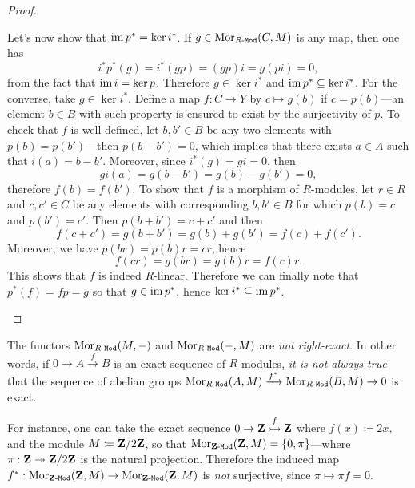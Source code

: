 \begin{proof}
\begin{enumerate}[(a)]
              Let's now show that \(\operatorname{im} p^{*} = \ker i^{*}\). If
              \(g \in \operatorname{Mor}_{{R\text{-}\texttt{Mod}}}(C, M)\) is any map, then one has
              \[
                  i^{*} p^{*}(g) = i^{*}(g p) = (g p) i = g (p i) = 0,
              \]
              from the fact that \(\operatorname{im} i = \ker p\). Therefore \(g \in \ker i^{*}\) and
              \(\operatorname{im} p^{*} \subseteq \ker i^{*}\). For the converse, take
              \(g \in \ker i^{*}\). Define a map \(f: C \to Y\) by \(c \mapsto g(b)\) if
              \(c = p(b)\)---an element \(b \in B\) with such property is ensured to exist
              by the surjectivity of \(p\). To check that \(f\) is well defined, let
              \(b, b' \in B\) be any two elements with \(p(b) = p(b')\)---then
              \(p(b - b') = 0\), which implies that there exists \(a \in A\) such that
              \(i(a) = b - b'\). Moreover, since \(i^{*}(g) = g i = 0\), then
              \[
                  g i(a) = g(b - b') = g(b) - g(b') = 0,
              \]
              therefore \(f(b) = f(b')\). To show that \(f\) is a morphism of \(R\)-modules,
              let \(r \in R\) and \(c, c' \in C\) be any elements with corresponding
              \(b, b' \in B\) for which \(p(b) = c\) and \(p(b') = c'\). Then
              \(p(b + b') = c + c'\) and then
              \[
                  f(c + c') = g(b + b') = g(b) + g(b') = f(c) + f(c').
              \]
              Moreover, we have \(p(b r) = p(b) r = c r\), hence
              \[
                  f(c r) = g(b r) = g(b) r = f(c) r.
              \]
              This shows that \(f\) is indeed \(R\)-linear. Therefore we can finally note
              that \(p^{*}(f) = f p = g\) so that \(g \in \operatorname{im} p^{*}\), hence
              \(\ker i^{*} \subseteq \operatorname{im} p^{*}\).
    \end{enumerate}
\end{proof}

\begin{remark}
    \label{rem:not-right-exact}
    The functors \(\operatorname{Mor}_{{R\text{-}\texttt{Mod}}}(M, -)\) and \(\operatorname{Mor}_{{R\text{-}\texttt{Mod}}}(-, M)\) are \emph{not
        right-exact}. In other words, if \(0 \to A \xrightarrow f B\) is an exact
    sequence of \(R\)-modules, \emph{it is not always true} that the sequence of
    abelian groups
    \(\operatorname{Mor}_{{R\text{-}\texttt{Mod}}}(A, M) \xrightarrow {f^{*}} \operatorname{Mor}_{{R\text{-}\texttt{Mod}}}(B, M) \to 0\) is exact.

    For instance, one can take the exact sequence \(0 \to \mathbf{Z} \overset f {\rightarrowtail} \mathbf{Z}\)
    where \(f(x) \coloneq 2 x\), and the module \(M \coloneq \mathbf{Z}/2\mathbf{Z}\), so that
    \(\operatorname{Mor}_{{\mathbf{Z}\text{-}\texttt{Mod}}}(\mathbf{Z}, M) = \{0, \pi\}\)---where \(\pi: \mathbf{Z} \twoheadrightarrow \mathbf{Z}/2\mathbf{Z}\) is the
    natural projection. Therefore the induced map
    \(f^{*}: \operatorname{Mor}_{{\mathbf{Z}\text{-}\texttt{Mod}}}(\mathbf{Z}, M) \to \operatorname{Mor}_{{\mathbf{Z}\text{-}\texttt{Mod}}}(\mathbf{Z}, M)\) is \emph{not}
    surjective, since \(\pi \mapsto \pi f = 0\).
\end{remark}

